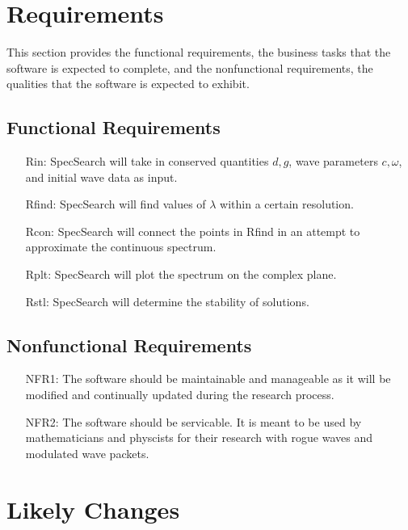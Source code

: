 \documentclass[12pt]{article}
\begin{document}
\section{Requirements}

This section provides the functional requirements, the business tasks that the
software is expected to complete, and the nonfunctional requirements, the
qualities that the software is expected to exhibit.\\

\subsection{Functional Requirements}

\noindent \begin{itemize}

\item[Rin:] SpecSearch will 
take in 
conserved quantities $d,g$, wave parameters $c,\omega$, and initial wave data 
as input. 

\item[Rfind:] SpecSearch 
will find values of $\lambda$ within a certain resolution.

\item[Rcon:] SpecSearch will 
connect the points in Rfind in an attempt to approximate the continuous 
spectrum.

\item[Rplt:] SpecSearch 
will plot the spectrum on the complex plane. 

\item[Rstl:] SpecSearch 
will determine the stability of solutions.  


\end{itemize}

\subsection{Nonfunctional Requirements}
\noindent \begin{itemize}
\item[NFR1:] The software should be maintainable and manageable as it will 
be modified and continually updated during the research process. 
\item[NFR2:] The software should be servicable. It is meant to be used by 
mathematicians and physcists for their research with rogue waves and modulated 
wave packets.
\end{itemize}


\section{Likely Changes}    
\end{document}

